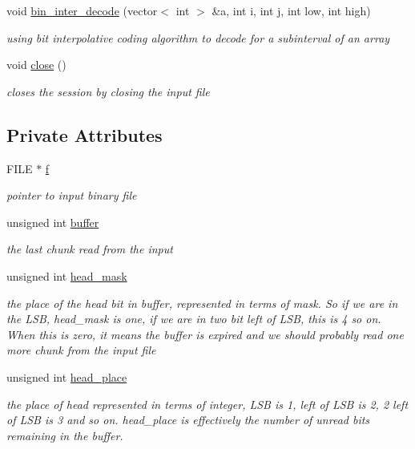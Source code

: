 \begin{DoxyCompactItemize}
void \hyperlink{classibitstream_a97983c20903c908fafb26e250bf9e812}{bin\+\_\+inter\+\_\+decode} (vector$<$ int $>$ \&a, int i, int j, int low, int high)
\begin{DoxyCompactList}\small\item\em using bit interpolative coding algorithm to decode for a subinterval of an array \end{DoxyCompactList}\item 
void \hyperlink{classibitstream_aa7b59600e58571b802d6d0dadf92d37a}{close} ()
\begin{DoxyCompactList}\small\item\em closes the session by closing the input file \end{DoxyCompactList}\end{DoxyCompactItemize}
\subsection*{Private Attributes}
\begin{DoxyCompactItemize}
\item 
F\+I\+LE $\ast$ \hyperlink{classibitstream_a3ea2cdd0cf97820f0e1520c42e364308}{f}
\begin{DoxyCompactList}\small\item\em pointer to input binary file \end{DoxyCompactList}\item 
unsigned int \hyperlink{classibitstream_a73f0b24d3d4402369f1abbb43f7f70ef}{buffer}
\begin{DoxyCompactList}\small\item\em the last chunk read from the input \end{DoxyCompactList}\item 
unsigned int \hyperlink{classibitstream_a48cd41991b6c29ea5120b53873a72a70}{head\+\_\+mask}
\begin{DoxyCompactList}\small\item\em the place of the head bit in buffer, represented in terms of mask. So if we are in the L\+SB, head\+\_\+mask is one, if we are in two bit left of L\+SB, this is 4 so on. When this is zero, it means the buffer is expired and we should probably read one more chunk from the input file \end{DoxyCompactList}\item 
unsigned int \hyperlink{classibitstream_a7b96359ac1534a5565e6e9b0cc53a0b3}{head\+\_\+place}
\begin{DoxyCompactList}\small\item\em the place of head represented in terms of integer, L\+SB is 1, left of L\+SB is 2, 2 left of L\+SB is 3 and so on. head\+\_\+place is effectively the number of unread bits remaining in the buffer. \end{DoxyCompactList}\end{DoxyCompactItemize}


